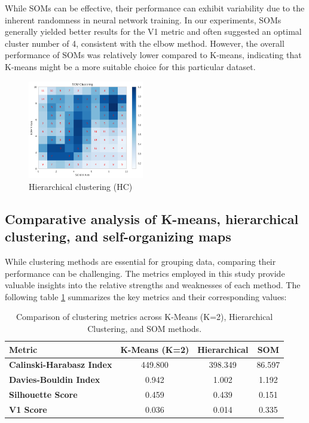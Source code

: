 \documentclass{llncs}
\begin{document}
  While SOMs can be effective, their performance can exhibit variability due to the inherent randomness in neural network training. In our experiments, SOMs generally yielded better results for the V1 metric and often suggested an optimal cluster number of 4, consistent with the elbow method. However, the overall performance of SOMs was relatively lower compared to K-means, indicating that K-means might be a more suitable choice for this particular dataset.
  
    \begin{figure}[h!]
  	\begin{center}  %
  		\includegraphics[width=0.45\textwidth]{images/SOM_clustering.png}
  		\caption{Hierarchical clustering (HC)}
  		\label{fig:SOM}
  	\end{center}
  \end{figure}
  
  \subsection{Comparative analysis of K-means, hierarchical clustering, and self-organizing maps}
  
  While clustering methods are essential for grouping data, comparing their performance can be challenging. The metrics employed in this study provide valuable insights into the relative strengths and weaknesses of each method. The following table \ref{tab:metrics_comparison} summarizes the key metrics and their corresponding values:
  
  \begin{table}[h!]
  	\centering
  	\begin{tabular}{|l|c|c|c|}
  		\hline
  		\textbf{Metric} & \textbf{K-Means (K=2)} & \textbf{Hierarchical} & \textbf{SOM} \\ \hline
  		\textbf{Calinski-Harabasz Index} & 449.800 & 398.349 & 86.597 \\ \hline
  		\textbf{Davies-Bouldin Index} & 0.942 & 1.002 & 1.192 \\ \hline
  		\textbf{Silhouette Score} & 0.459 & 0.439 & 0.151 \\ \hline
  		\textbf{V1 Score} & 0.036 & 0.014 & 0.335 \\ \hline
  	\end{tabular}
  	\caption{Comparison of clustering metrics across K-Means (K=2), Hierarchical Clustering, and SOM methods.}
  	\label{tab:metrics_comparison}
  \end{table}
  
\end{document}
